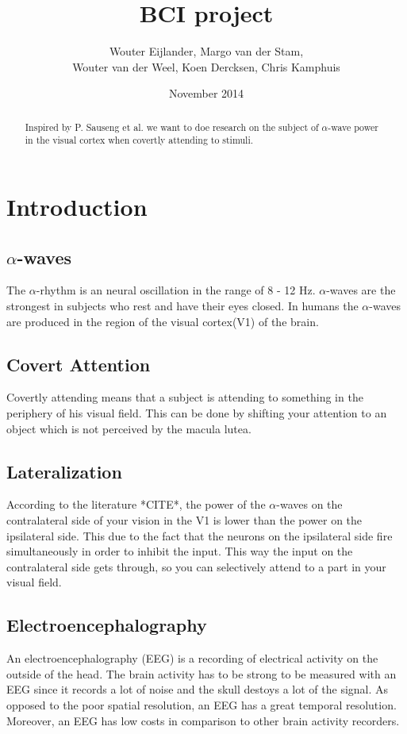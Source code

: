 \documentclass{article}
\title{BCI project}
\author{Wouter Eijlander, Margo van der Stam, 
				\\Wouter van der Weel, Koen Dercksen, Chris Kamphuis}
\date{November 2014}
\begin{document}
\maketitle
\begin{abstract}
	Inspired by P. Sauseng et al.\cite{Sauseng2005} we want to doe research on
	the subject of $\alpha$-wave power in the visual cortex when covertly
	attending to stimuli.
\end{abstract}

\section{Introduction}
\subsection{$\alpha$-waves}
The $\alpha$-rhythm is an neural oscillation in the range of 8 - 12 Hz. 
$\alpha$-waves are the strongest in subjects who rest and have their eyes
closed. In humans the $\alpha$-waves are produced in the region of the visual
cortex(V1) of the brain. 
\subsection{Covert Attention}
Covertly attending means that a subject is attending to something in the
periphery of his visual field. This can be done by shifting your attention to
an object which is not perceived by the macula lutea.
\subsection{Lateralization}
According to the literature *CITE*, the power of the $\alpha$-waves on the
contralateral side of your vision in the V1 is lower than the power on the
ipsilateral side. This due to the fact that the neurons on the ipsilateral side
fire simultaneously in order to inhibit the input. This way the input on the
contralateral side gets through, so you can selectively attend to a part in
your visual field. %
\subsection{Electroencephalography}
An electroencephalography (EEG) is a recording of electrical activity on the
outside of the head. The brain activity has to be strong to be measured with an
EEG since it records a lot of noise and the skull destoys a lot of the signal.
As opposed to the poor spatial resolution, an EEG has a great temporal
resolution. Moreover, an EEG has low costs in comparison to other brain
activity recorders. 
\end{document}
